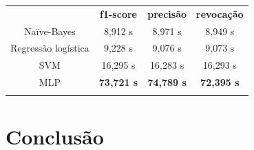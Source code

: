 \documentclass[a4paper,11pt]{article}
\begin{document}
\vspace{.5cm}
\begin{center}
\begin{tabular}{cccc}
 \hline
	        &  \textbf{f1-score}  & \textbf{precisão}  & \textbf{revocação} \\
 Naïve-Bayes	&  8,912 s 	 & 8,971 s  	& 8,949 s \\
 Regressão logística & 9,228 s 	 & 9,076 s  	& 9,073 s  \\
 SVM            &  16,295 s 	 & 16,283 s 	& 16,293 s \\
 MLP 		&  \textbf{73,721 s}  & \textbf{74,789 s}   & \textbf{72,395 s}  \\
 \hline
 \label{tab:tempo}
\end{tabular}
\end{center}




\section{Conclusão}




 
\end{document}
